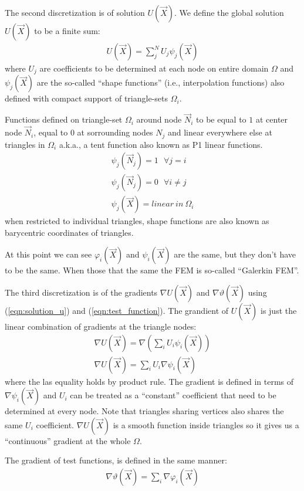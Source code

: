 \documentclass{birkjour}
\numberwithin{equation}{section}
\begin{document}
The second discretization is of solution $U(\vec X)$. We define the global solution $U(\vec X)$ to be a finite sum:
\begin{eqnarray}
	\label{eqn:solution_u}
	U(\vec X) = \sum_j^N{ U_j \psi_j(\vec X) }
\end{eqnarray}
where $U_j$ are coefficients to be determined at each node on entire domain $\Omega$ and $\psi_j(\vec X)$ are the 
so-called ``shape functions'' (i.e., interpolation functions) also defined with compact support of triangle-sets $\Omega_i$.

Functions defined on triangle-set $\Omega_i$ around node $\vec N_i$ to be equal to $1$ at center node $\vec N_i$, equal to $0$ at 
sorrounding nodes $N_j$ and linear everywhere else at triangles in $\Omega_i$ a.k.a., a tent function also known as P1 linear functions.
\begin{eqnarray}
	\psi_j(\vec N_j) = 1 \ \ \  \forall j = i  \nonumber\\
	\psi_j(\vec N_j) = 0 \ \ \  \forall i \neq j \nonumber\\
	\psi_j(\vec X) = linear \ in \ \Omega_i \nonumber
\end{eqnarray}
when restricted to individual triangles, shape functions are also known as barycentric coordinates of triangles.

At this point we can see $\varphi_i(\vec X)$ and $\psi_i(\vec X)$ are the same, but they don't have to be the same. 
When those that the same the FEM is so-called ``Galerkin FEM''. 

The third discretization is of the gradients $\nabla U(\vec X)$ and $\nabla \vartheta(\vec X)$ 
using (\ref{eqn:solution_u}) and (\ref{eqn:test_function}). The grandient of $U(\vec X)$ 
is just the linear combination of gradients at the triangle nodes:
\begin{eqnarray}
	\label{eqn:gradient_u}
	\nabla U(\vec X) = \nabla \left(\sum_i {U_i \psi_i(\vec X)} \right) \nonumber\\
	\nabla U(\vec X) = \sum_i { U_i \nabla \psi_i(\vec X) }
\end{eqnarray}
where the las equality holds by product rule. The gradient is defined in terms of $\nabla \psi_i(\vec X)$ and 
$U_i$ can be treated as a ``constant'' coefficient 
that need to be determined at every node. Note that triangles sharing vertices also shares the same $U_i$ coefficient. 
$\nabla U(\vec X)$ is a smooth function inside triangles so it gives us a ``continuous'' gradient at the whole $\Omega$.

The gradient of test functions, is defined in the same manner:
\begin{eqnarray}
	\label{eqn:gradient_v}
	\nabla \vartheta(\vec X) = \sum_i { \nabla \varphi_i(\vec X) }
\end{eqnarray}
\end{document}
